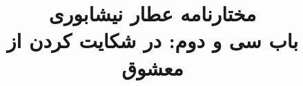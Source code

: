 \documentclass[14pt,b5paper]{article}
\begin{document}
\title{\Huge مختارنامه عطار نیشابوری \\
باب سی و دوم: در شکایت کردن از معشوق}
\author{ }
\date{ }
\maketitle
\newpage
\tableofcontents
\newpage

\newpage

\newpage

\newpage

\newpage

\newpage

\newpage

\newpage

\newpage

\newpage

\newpage

\newpage

\newpage

\newpage

\newpage

\newpage

\newpage

\newpage

\newpage

\newpage

\newpage

\newpage

\newpage

\newpage

\newpage

\newpage

\newpage

\newpage

\newpage

\newpage

\newpage

\newpage

\newpage

\newpage

\newpage

\newpage

\newpage

\newpage

\newpage

\newpage

\newpage

\newpage

\newpage

\newpage

\newpage

\newpage

\newpage

\newpage

\newpage

\newpage

\newpage

\newpage

\newpage

\newpage

\newpage

\newpage

\newpage

\newpage

\newpage

\newpage

\newpage

\newpage
\end{document}
